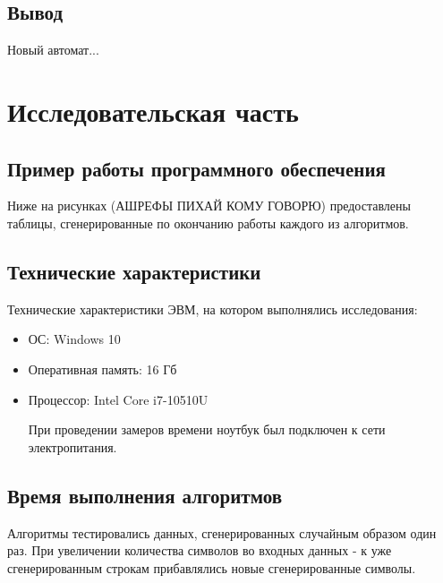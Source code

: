 \documentclass[12pt]{report}
\begin{document}
\section{Вывод}
Новый автомат...

\chapter{Исследовательская часть}

\section{Пример работы программного обеспечения}
Ниже на рисунках (АШРЕФЫ ПИХАЙ КОМУ ГОВОРЮ) предоставлены таблицы, сгенерированные по окончанию работы каждого из алгоритмов.

\section{Технические характеристики}
Технические характеристики ЭВМ, на котором выполнялись исследования:
\begin{itemize}
\item ОС: Windows 10
\item Оперативная память: 16 Гб
\item Процессор: Intel Core i7-10510U

При проведении замеров времени ноутбук был подключен к сети электропитания.
\end{itemize}

\section{Время выполнения алгоритмов}
Алгоритмы тестировались данных, сгенерированных случайным образом один раз. При увеличении количества символов во входных данных - к уже сгенерированным строкам прибавлялись новые сгенерированные символы.
\end{document}
